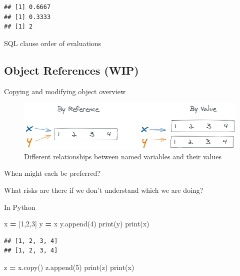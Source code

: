 \documentclass[
]{krantz}
\makeatletter
\newenvironment{Shaded}{\begin{snugshade}}{\end{snugshade}}
\newcommand{\BuiltInTok}[1]{#1}
\newcommand{\DecValTok}[1]{\textcolor[rgb]{0.06,0.06,0.06}{#1}}
\newcommand{\NormalTok}[1]{#1}
\newcommand{\OperatorTok}[1]{\textcolor[rgb]{0.43,0.43,0.43}{\textbf{#1}}}
\newenvironment{kframe}{%
\medskip{}
\setlength{\fboxsep}{.8em}
 \def\at@end@of@kframe{}%
 \ifinner\ifhmode%
  \def\at@end@of@kframe{\end{minipage}}%
  \begin{minipage}{\columnwidth}%
 \fi\fi%
 \def\FrameCommand##1{\hskip\@totalleftmargin \hskip-\fboxsep
 \colorbox{shadecolor}{##1}\hskip-\fboxsep
     \hskip-\linewidth \hskip-\@totalleftmargin \hskip\columnwidth}%
 \MakeFramed {\advance\hsize-\width
   \@totalleftmargin\z@ \linewidth\hsize
   \@setminipage}}%
 {\par\unskip\endMakeFramed%
 \at@end@of@kframe}
\renewenvironment{Shaded}{\begin{kframe}}{\end{kframe}}
\makeatother
\begin{document}
\begin{verbatim}
## [1] 0.6667
## [1] 0.3333
## [1] 2
\end{verbatim}

SQL clause order of evaluations

\hypertarget{object-references-wip}{%
\subsection{Object References (WIP)}\label{object-references-wip}}

Copying and modifying object overview

\begin{figure}

{\centering \includegraphics[width=0.9\linewidth]{figures/comp-quan/ref-val} 

}

\caption{Different relationships between named variables and their values}\label{fig:unnamed-chunk-129}
\end{figure}

When might each be preferred?

What risks are there if we don't understand which we are doing?

In Python

\begin{Shaded}
\begin{Highlighting}[]
\NormalTok{x }\OperatorTok{=}\NormalTok{ [}\DecValTok{1}\NormalTok{,}\DecValTok{2}\NormalTok{,}\DecValTok{3}\NormalTok{]}
\NormalTok{y }\OperatorTok{=}\NormalTok{ x}
\NormalTok{y.append(}\DecValTok{4}\NormalTok{)}
\BuiltInTok{print}\NormalTok{(y)}
\BuiltInTok{print}\NormalTok{(x)}
\end{Highlighting}
\end{Shaded}

\begin{verbatim}
## [1, 2, 3, 4]
## [1, 2, 3, 4]
\end{verbatim}

\begin{Shaded}
\begin{Highlighting}[]
\NormalTok{z }\OperatorTok{=}\NormalTok{ x.copy()}
\NormalTok{z.append(}\DecValTok{5}\NormalTok{)}
\BuiltInTok{print}\NormalTok{(z)}
\BuiltInTok{print}\NormalTok{(x)}
\end{Highlighting}
\end{Shaded}
\end{document}
